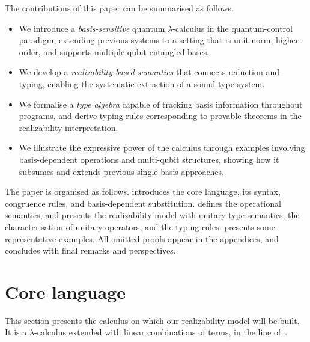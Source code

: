 \documentclass[runningheads,orivec,envcountsame,envcountsect]{llncs}
\begin{document}
The contributions of this paper can be summarised as follows.
\begin{itemize}
  \item We introduce a \emph{basis-sensitive} quantum $\lambda$-calculus in the
  quantum-control paradigm, extending previous systems to a setting that is
  unit-norm, higher-order, and supports multiple-qubit entangled bases.
\item We develop a \emph{realizability-based semantics} that connects
  reduction and typing, enabling the systematic extraction of a sound
  type system.
  \item We formalise a \emph{type algebra} capable of tracking basis
  information throughout programs, and derive typing rules corresponding to
  provable theorems in the realizability interpretation.
  \item We illustrate the expressive power of the calculus through examples
  involving basis-dependent operations and multi-qubit structures, showing how
  it subsumes and extends previous single-basis approaches.
\end{itemize}

The paper is organised as follows.  
 introduces the core language, its syntax, congruence rules,
and basis-dependent substitution.  
 defines the operational semantics, and
 presents the realizability model with unitary type semantics,
the characterisation of unitary operators, and the typing rules.  
 presents some representative examples.
All omitted proofs appear in the appendices, and
 concludes with final remarks and perspectives.

\section{Core language}\label{sec:calculus}
This section presents the calculus on which our realizability model will be
built. It is a $\lambda$-calculus extended with linear combinations of terms, in the line of~\cite{ArrighiDowekLMCS17}.
\end{document}
